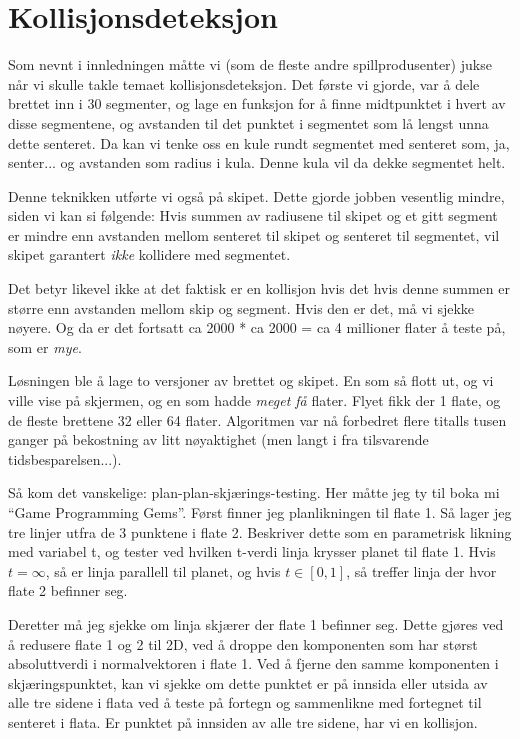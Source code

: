 \documentclass[11pt, dvips]{report}
\begin{document}
\chapter{Kollisjonsdeteksjon}\label{collision}

Som nevnt i innledningen måtte vi (som de fleste andre
spillprodusenter) jukse når vi skulle takle temaet
kollisjonsdeteksjon. Det første vi gjorde, var å dele brettet inn i 30
segmenter, og lage en funksjon for å finne midtpunktet i hvert av
disse segmentene, og avstanden til det punktet i segmentet som lå
lengst unna dette senteret. Da kan vi tenke oss en kule rundt
segmentet med senteret som, ja, senter... og avstanden som radius i
kula. Denne kula vil da dekke segmentet helt. 

Denne teknikken utførte vi også på skipet. Dette gjorde jobben
vesentlig mindre, siden vi kan si følgende: Hvis summen av radiusene
til skipet og et gitt segment er mindre enn avstanden mellom senteret
til skipet og senteret til segmentet, vil skipet garantert \emph{ikke}
kollidere med segmentet.

Det betyr likevel ikke at det faktisk er en kollisjon hvis det hvis
denne summen er større enn avstanden mellom skip og segment. Hvis den
er det, må vi sjekke nøyere. Og da er det fortsatt ca 2000 * ca 2000 =
ca 4 millioner flater å teste på, som er \emph{mye}.

Løsningen ble å lage to versjoner av brettet og skipet. En som så flott ut, og
vi ville vise på skjermen, og en som hadde \emph{meget få} flater.
Flyet fikk der 1 flate, og de fleste brettene 32 eller 64 flater.
Algoritmen var nå forbedret flere titalls tusen ganger på bekostning av
litt nøyaktighet (men langt i fra tilsvarende tidsbesparelsen...).

Så kom det vanskelige: plan-plan-skjærings-testing. Her måtte jeg ty
til boka mi ``Game Programming Gems''. Først finner jeg planlikningen
til flate 1. Så lager jeg tre linjer utfra de 3 punktene i flate 2.
Beskriver dette som en parametrisk likning med variabel t, og tester
ved hvilken t-verdi linja krysser planet til flate 1. Hvis $t=\infty$, 
så er linja parallell til planet, og hvis $t\in[0,1]$, så treffer
linja der hvor flate 2 befinner seg.

Deretter må jeg sjekke om linja skjærer der flate 1 befinner seg.
Dette gjøres ved å redusere flate 1 og 2 til 2D, ved å droppe den
komponenten som har størst absoluttverdi i normalvektoren i flate 1.
Ved å fjerne den samme komponenten i skjæringspunktet, kan vi
sjekke om dette punktet er på innsida eller utsida av alle tre sidene
i flata ved å teste på fortegn og sammenlikne med fortegnet til
senteret i flata. Er punktet på innsiden av alle tre sidene, har vi en
kollisjon.
\end{document}

